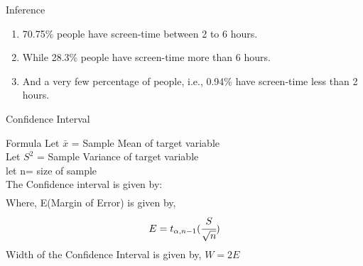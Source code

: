 \documentclass{beamer}
\begin{document}
\begin{frame}
\begin{block}{Inference}
\begin{enumerate}
\item 70.75\% people have screen-time between 2 to 6 hours. 
\item While 28.3\% people have screen-time more than 6 hours.
\item And a very few percentage of people, i.e., 0.94\% have screen-time less than 2 hours.
\end{enumerate}
\end{block}
\end{frame}





\begin{frame}{Confidence Interval}
\begin{block}{Formula}
Let $\bar{x}$ = Sample Mean of target variable  \\
Let $S^2$ = Sample Variance of target variable \\
let  n= size of sample  
\\The Confidence interval is given by:
      \begin{align}
      [\bar{x} - E,\bar{x} + E]
 \end{align}
Where, E(Margin of Error) is given by,
 \begin{align}
      E =t_{{\alpha}, n-1}(\cfrac{S}{\sqrt{n}})
 \end{align}
 Width of the Confidence Interval is given by, $W = 2E$
\end{block}
\end{frame}
\end{document}
